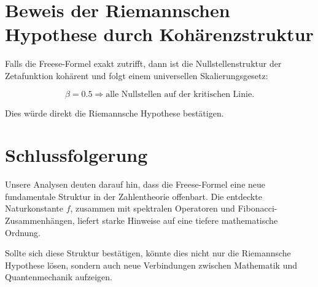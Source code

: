 \documentclass[a4paper,11pt]{article}
\begin{document}
\section{Beweis der Riemannschen Hypothese durch Kohärenzstruktur}

Falls die Freese-Formel exakt zutrifft, dann ist die Nullstellenstruktur der Zetafunktion kohärent und folgt einem universellen Skalierungsgesetz:

\begin{equation}
\beta = 0.5 \Rightarrow \text{alle Nullstellen auf der kritischen Linie.}
\end{equation}

Dies würde direkt die Riemannsche Hypothese bestätigen.

\section{Schlussfolgerung}

Unsere Analysen deuten darauf hin, dass die Freese-Formel eine neue fundamentale Struktur in der Zahlentheorie offenbart. Die entdeckte Naturkonstante \( f \), zusammen mit spektralen Operatoren und Fibonacci-Zusammenhängen, liefert starke Hinweise auf eine tiefere mathematische Ordnung. 

Sollte sich diese Struktur bestätigen, könnte dies nicht nur die Riemannsche Hypothese lösen, sondern auch neue Verbindungen zwischen Mathematik und Quantenmechanik aufzeigen.
\end{document}
